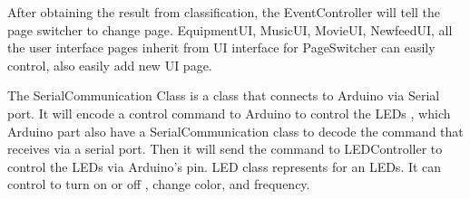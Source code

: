 After obtaining the result from classification, the EventController will tell the page switcher to change page. EquipmentUI, MusicUI, MovieUI, NewfeedUI, all the user interface pages inherit from UI interface for PageSwitcher can easily control, also easily add new UI page.

The SerialCommunication Class is a class that connects to Arduino via Serial port. It will encode a control command to Arduino to control the LEDs , which Arduino part also have a SerialCommunication class to decode the command that receives via a serial port. Then it will send the command to LEDController to control the LEDs via Arduino's pin. LED class represents for an LEDs. It can control to turn on or off , change color, and frequency.
